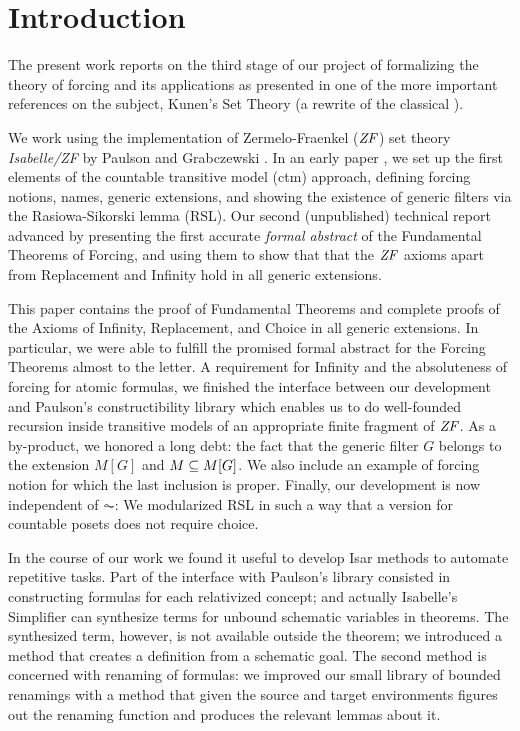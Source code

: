 \section{Introduction}
\label{sec:introduction}

The present work reports on the third stage of our project of
formalizing the theory of forcing and its applications as presented in
one of the more
important references on the subject, Kunen's Set Theory
\cite{kunen2011set} (a rewrite of the classical \cite{kunen1980}). 

We
work using the  implementation of Zermelo-Fraenkel ($\mathit{ZF}$)
set theory \emph{Isabelle/ZF} by Paulson and Grabczewski \cite{DBLP:journals/jar/PaulsonG96}. In
an early paper \cite{2018arXiv180705174G}, we set up the first
elements of the countable transitive model (ctm) approach, defining
forcing notions, names, generic extensions, and
showing the existence of generic filters via the Rasiowa-Sikorski
lemma (RSL). Our second (unpublished) technical report
\cite{2019arXiv190103313G} advanced by presenting the first accurate
\emph{formal abstract} of the Fundamental Theorems of Forcing, and
using them to show that that the $\mathit{ZF}$ axioms apart from Replacement
and Infinity hold in all generic extensions.

This paper contains the proof of Fundamental Theorems and complete
proofs of the Axioms of Infinity, Replacement, and Choice in all
generic extensions. In particular, we were able to fulfill the
promised formal abstract for the Forcing 
Theorems almost to the letter. A requirement for Infinity and the
absoluteness of forcing for atomic formulas, we finished the interface
between our development and
Paulson's constructibility library \cite{paulson_2003} which enables
us to do well-founded
recursion inside transitive models of an appropriate finite fragment
of $\mathit{ZF}$. As a by-product, we honored a long debt: the fact that the
generic filter $G$ belongs to the extension $M[G]$ and 
$M\subseteq M[G]$. We also include an example of forcing notion for which
the last inclusion is proper.
Finally, our development is now independent of $\AC$: We modularized
RSL in such a way that a version for countable 
posets does not require choice.

In the course of our work we found it useful to develop Isar methods to
automate repetitive tasks. Part of the interface with Paulson's
library consisted in constructing formulas for each relativized
concept; and actually Isabelle's Simplifier can
synthesize terms for unbound schematic variables in theorems. The
synthesized term, however, is not available outside the theorem; we
introduced a method that creates a definition from a schematic
goal. The second method is concerned with renaming of formulas: we
improved our small library of bounded renamings with a method that
given the source and target environments figures out the renaming
function and produces the relevant lemmas about it.

